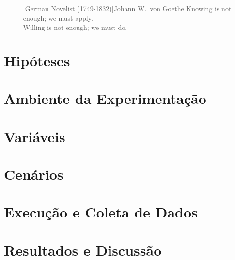 \documentclass[final]{rc-book-2.14}
\begin{document}
\begin{quotation}[German Novelist (1749-1832)]{Johann W.~von Goethe}
    Knowing is not enough; we must apply. \\ Willing is not enough; we must do.
\end{quotation}



\section{Hipóteses}
\label{sec:experiments:hipoteses}


\section{Ambiente da Experimentação}
\label{sec:experiments:environment}


\section{Variáveis}
\label{sec:experiments:variables}


\section{Cenários}
\label{sec:experiments:scenarios}


\section{Execução e Coleta de Dados}
\label{sec:experiments:execution}


\section{Resultados e Discussão}
\label{sec:experiments:results-discussion}
\end{document}
